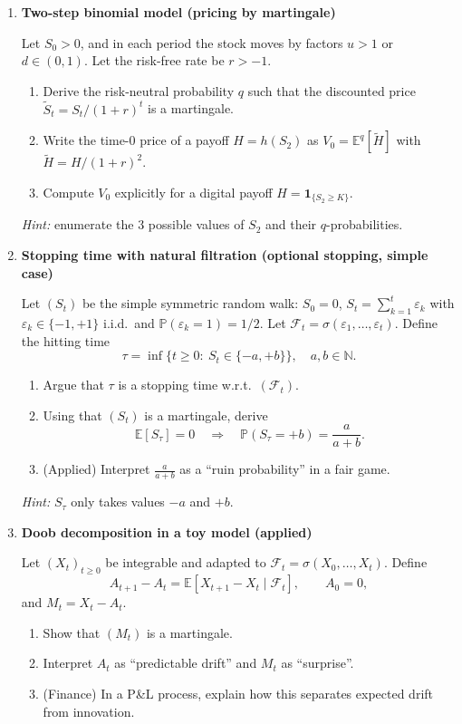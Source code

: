 \documentclass[11pt]{article}
\begin{document}
\begin{enumerate}
\bigskip

\item \textbf{Two-step binomial model (pricing by martingale)}

Let $S_0>0$, and in each period the stock moves by factors $u>1$ or $d\in(0,1)$.
Let the risk-free rate be $r> -1$.
\begin{enumerate}
\item Derive the risk-neutral probability $q$ such that the discounted price
$\tilde S_t=S_t/(1+r)^t$ is a martingale.
\item Write the time-0 price of a payoff $H=h(S_2)$ as $V_0=\mathbb{E}^q[\tilde H]$ with $\tilde H=H/(1+r)^2$.
\item Compute $V_0$ explicitly for a digital payoff $H=\mathbf{1}_{\{S_2\ge K\}}$.
\end{enumerate}
\emph{Hint:} enumerate the 3 possible values of $S_2$ and their $q$-probabilities.

\bigskip

\item \textbf{Stopping time with natural filtration (optional stopping, simple case)}

Let $(S_t)$ be the simple symmetric random walk: $S_0=0$, $S_t=\sum_{k=1}^t \varepsilon_k$
with $\varepsilon_k\in\{-1,+1\}$ i.i.d.\ and $\mathbb{P}(\varepsilon_k=1)=1/2$.
Let $\mathcal{F}_t=\sigma(\varepsilon_1,\dots,\varepsilon_t)$.
Define the hitting time
\[
\tau=\inf\{t\ge 0:\ S_t\in\{-a,+b\}\},
\quad a,b\in\mathbb{N}.
\]
\begin{enumerate}
\item Argue that $\tau$ is a stopping time w.r.t.\ $(\mathcal{F}_t)$.
\item Using that $(S_t)$ is a martingale, derive
\[
\mathbb{E}[S_\tau]=0
\quad\Rightarrow\quad
\mathbb{P}(S_\tau=+b)=\frac{a}{a+b}.
\]
\item (Applied) Interpret $\frac{a}{a+b}$ as a ``ruin probability'' in a fair game.
\end{enumerate}
\emph{Hint:} $S_\tau$ only takes values $-a$ and $+b$.

\bigskip

\item \textbf{Doob decomposition in a toy model (applied)}

Let $(X_t)_{t\ge0}$ be integrable and adapted to $\mathcal{F}_t=\sigma(X_0,\dots,X_t)$.
Define
\[
A_{t+1}-A_t=\mathbb{E}[X_{t+1}-X_t\mid \mathcal{F}_t],
\qquad A_0=0,
\]
and $M_t=X_t-A_t$.
\begin{enumerate}
\item Show that $(M_t)$ is a martingale.
\item Interpret $A_t$ as ``predictable drift'' and $M_t$ as ``surprise''.
\item (Finance) In a P\&L process, explain how this separates expected drift from innovation.
\end{enumerate}


\end{enumerate}
\end{document}
